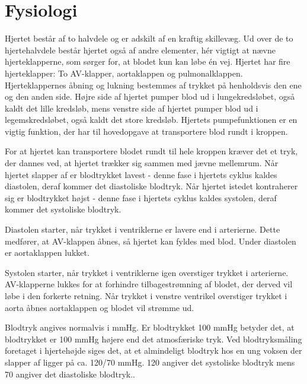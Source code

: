 \section{Fysiologi}

Hjertet består af to halvdele og er adskilt af en kraftig skillevæg. Ud over de to hjertehalvdele består hjertet også af andre elementer, hér vigtigt at nævne hjerteklapperne, som sørger for, at blodet kun kan løbe én vej. Hjertet har fire hjerteklapper: To AV-klapper, aortaklappen og pulmonalklappen. Hjerteklappernes åbning og lukning bestemmes af trykket på henholdsvis den ene og den anden side. Højre side af hjertet pumper blod ud i lungekredsløbet, også kaldt det lille kredsløb, mens venstre side af hjertet pumper blod ud i legemskredsløbet, også kaldt det store kredsløb. Hjertets pumpefunktionen er en vigtig funktion, der har til hovedopgave at transportere blod rundt i kroppen.

\vspace{0.125 cm}
For at hjertet kan transportere blodet rundt til hele kroppen kræver det et tryk, der dannes ved, at hjertet trækker sig sammen med jævne mellemrum. Når hjertet slapper af er blodtrykket lavest - denne fase i hjertets cyklus kaldes diastolen, deraf kommer det diastoliske blodtryk. Når hjertet istedet kontraherer sig er blodtrykket højst - denne fase i hjertets cyklus kaldes systolen, deraf kommer det systoliske blodtryk.

\vspace{0.125 cm}
Diastolen starter, når trykket i ventriklerne er lavere end i arterierne. Dette medfører, at AV-klappen åbnes, så hjertet kan fyldes med blod. Under diastolen er aortaklappen lukket.

\vspace{0.125 cm}
Systolen starter, når trykket i ventriklerne igen overstiger trykket i arterierne. AV-klapperne lukkes for at forhindre tilbagestrømning af blodet, der derved vil løbe i den forkerte retning. Når trykket i venstre ventrikel overstiger trykket i aorta åbnes aortaklappen og blodet vil strømme ud. 

\vspace{0.1 cm}
Blodtryk angives normalvis i mmHg. Er blodtrykket 100 mmHg betyder det, at blodtrykket er 100 mmHg højere end det atmosfæriske tryk. Ved blodtryksmåling foretaget i hjertehøjde siges det, at et almindeligt blodtryk hos en ung voksen der slapper af ligger på ca. 120/70 mmHg. 120 angiver det systoliske blodtryk mens 70 angiver det diastoliske blodtryk..